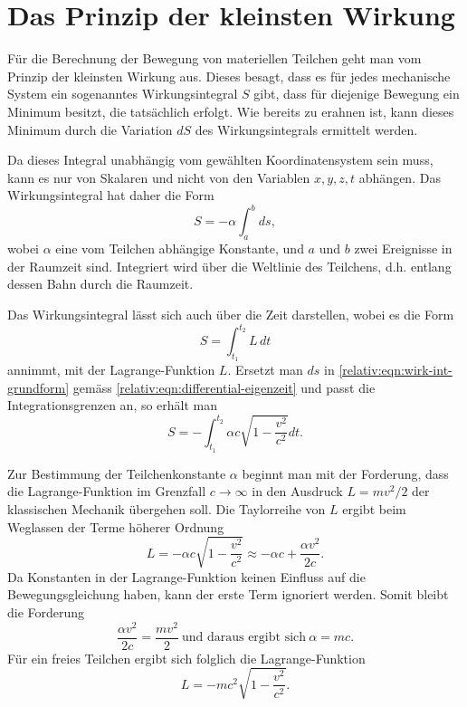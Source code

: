 
\section{Das Prinzip der kleinsten Wirkung 
\label{relativ:section:kleinste-wirkung}}

Für die Berechnung der Bewegung von materiellen Teilchen geht man
vom Prinzip der kleinsten Wirkung aus.
Dieses besagt, dass es für jedes mechanische System ein sogenanntes
Wirkungsintegral \(S\) gibt,
dass für diejenige Bewegung ein Minimum besitzt, die tatsächlich erfolgt.
Wie bereits zu erahnen ist, kann dieses Minimum durch die Variation \(dS\)
des Wirkungsintegrals ermittelt werden.

Da dieses Integral unabhängig vom gewählten Koordinatensystem sein muss,
kann es nur von Skalaren und nicht von den Variablen \(x, y, z, t\) abhängen.
Das Wirkungsintegral hat daher die Form
\begin{equation}
    S = - \alpha \int_{a}^{b} ds,
\label{relativ:eqn:wirk-int-grundform}
\end{equation}
wobei \(\alpha\) eine vom Teilchen abhängige Konstante,
und \(a\) und \(b\) zwei Ereignisse in der Raumzeit sind.
Integriert wird über die Weltlinie des Teilchens,
d.h. entlang dessen Bahn durch die Raumzeit.

Das Wirkungsintegral lässt sich auch über die Zeit darstellen,
wobei es die Form
\begin{equation}
    S = \int_{t_1}^{t_2} L \, dt
\label{relativ:eqn:wirk-int-zeit}
\end{equation}
annimmt, mit der Lagrange-Funktion \(L\).
Ersetzt man \(ds\) in \eqref{relativ:eqn:wirk-int-grundform}
gemäss \eqref{relativ:eqn:differential-eigenzeit} und passt
die Integrationsgrenzen an, so erhält man
\begin{equation}
    S = -\int_{t_1}^{t_2} \alpha c \sqrt{1-\frac{v^2}{c^2}} dt.
\end{equation}

Zur Bestimmung der Teilchenkonstante \(\alpha\) beginnt man mit der Forderung,
dass die Lagrange-Funktion im Grenzfall \(c\rightarrow\infty\) in den
Ausdruck \(L=mv^2/2\) der klassischen Mechanik übergehen soll.
Die Taylorreihe von \(L\) ergibt beim Weglassen der Terme höherer Ordnung
\begin{equation}
    L = - \alpha c \sqrt{1-\frac{v^2}{c^2}}
    \approx -\alpha c + \frac{\alpha v^2}{2c}.
\end{equation}
Da Konstanten in der Lagrange-Funktion keinen Einfluss auf die Bewegungsgleichung haben,
kann der erste Term ignoriert werden. Somit bleibt die Forderung
\begin{equation}
    \frac{\alpha v^2}{2c} = \frac{mv^2}{2}\
    \text{und daraus ergibt sich}\
    \alpha = mc.
\end{equation}
Für ein freies Teilchen ergibt sich folglich die Lagrange-Funktion
\begin{equation}
    L = -mc^2 \sqrt{1-\frac{v^2}{c^2}}.
\label{relativ:eqn:lagrange-freies-teilchen}
\end{equation}
